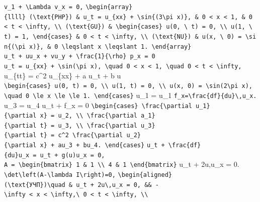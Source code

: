 \documentclass[
  ukrainian,
]{article}
\begin{document}
\texttt{v\_1\ +\ \textbackslash{}Lambda\ v\_x\ =\ 0,}
\texttt{\textbackslash{}begin\{array\}\{llll\}\ (\textbackslash{}text\{PHP\})\ \&\ u\_t\ =\ u\_\{xx\}\ +\ \textbackslash{}sin\{(3\textbackslash{}pi\ x)\},\ \&\ 0\ \textless{}\ x\ \textless{}\ 1,\ \&\ 0\ \textless{}\ t\ \textless{}\ \textbackslash{}infty,\ \textbackslash{}\textbackslash{}\ (\textbackslash{}text\{GU\})\ \&\ \textbackslash{}begin\{cases\}\ u(0,\ \textbackslash{}\ t)\ =\ 0,\ \textbackslash{}\textbackslash{}\ u(1,\ \textbackslash{}\ t)\ =\ 1,\ \textbackslash{}end\{cases\}\ \&\ 0\ \textless{}\ t\ \textless{}\ \textbackslash{}infty,\ \textbackslash{}\textbackslash{}\ (\textbackslash{}text\{NU\})\ \&\ u(x,\ \textbackslash{}\ 0)\ =\ \textbackslash{}sin\{(\textbackslash{}pi\ x)\},\ \&\ 0\ \textbackslash{}leqslant\ x\ \textbackslash{}leqslant\ 1.\ \textbackslash{}end\{array\}}
\texttt{u\_t\ +\ uu\_x\ +\ vu\_y\ +\ \textbackslash{}frac\{1\}\{\textbackslash{}rho\}\ p\_x\ =\ 0}
\texttt{u\_t\ =\ u\_\{xx\}\ +\ \textbackslash{}sin(\textbackslash{}pi\ x),\ \textbackslash{}quad\ 0\ \textless{}\ x\ \textless{}\ 1,\ \textbackslash{}quad\ 0\ \textless{}\ t\ \textless{}\ \textbackslash{}infty,}
u\_\{tt\} = c\^{}2 u\_\{xx\} + a u\_t + b u
\texttt{\textbackslash{}begin\{cases\}\ u(0,\ t)\ =\ 0,\ \textbackslash{}\textbackslash{}\ u(1,\ t)\ =\ 0,\ \textbackslash{}\textbackslash{}\ u(x,\ 0)\ =\ \textbackslash{}sin(2\textbackslash{}pi\ x),\ \textbackslash{}quad\ 0\ \textbackslash{}le\ x\ \textbackslash{}le\ \textbackslash{}le\ 1.\ \textbackslash{}end\{cases\}}
u\_1 = u\_1
\texttt{f\_x=\textbackslash{}frac\{df\}\{du\}\textbackslash{},u\_x.}
u\_3 = u\_4 u\_t + f\_x = 0
\texttt{\textbackslash{}begin\{cases\}\ \textbackslash{}frac\{\textbackslash{}partial\ u\_1\}\{\textbackslash{}partial\ x\}\ =\ u\_2,\ \textbackslash{}\textbackslash{}\ \textbackslash{}frac\{\textbackslash{}partial\ a\_1\}\{\textbackslash{}partial\ t\}\ =\ u\_3,\ \textbackslash{}\textbackslash{}\ \textbackslash{}frac\{\textbackslash{}partial\ u\_3\}\{\textbackslash{}partial\ t\}\ =\ c\^{}2\ \textbackslash{}frac\{\textbackslash{}partial\ u\_2\}\{\textbackslash{}partial\ x\}\ +\ au\_3\ +\ bu\_4.\ \textbackslash{}end\{cases\}}
\texttt{u\_t\ +\ \textbackslash{}frac\{df\}\{du\}u\_x\ =\ u\_t\ +\ g(u)u\_x\ =\ 0,}
\texttt{A\ =\ \textbackslash{}begin\{bmatrix\}\ 1\ \&\ 1\ \textbackslash{}\textbackslash{}\ 4\ \&\ 1\ \textbackslash{}end\{bmatrix\}}
u\_t + 2u,u\_x = 0.
\texttt{\textbackslash{}det\textbackslash{}left(A-\textbackslash{}lambda\ I\textbackslash{}right)=0,}
\texttt{\textbackslash{}begin\{aligned\}}
\texttt{(\textbackslash{}text\{УЧП\})\textbackslash{}quad\ \&\ u\_t\ +\ 2u\textbackslash{},u\_x\ =\ 0,\ \&\&\ -\textbackslash{}infty\ \textless{}\ x\ \textless{}\ \textbackslash{}infty,\textbackslash{}\ 0\ \textless{}\ t\ \textless{}\ \textbackslash{}infty,\ \textbackslash{}\textbackslash{}}
\end{document}
